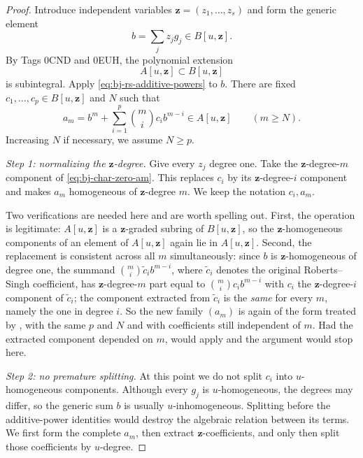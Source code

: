\begin{proof}
Introduce independent variables $\mathbf z=(z_1,\ldots,z_s)$ and form the
generic element
\[
                         b=\sum_j z_jg_j
                         \in B[u,\mathbf z].
\tag{44.5}\label{eq:bj-char-zero-generic-element}
\]
By Tags 0CND and 0EUH, the polynomial extension
\[
              A[u,\mathbf z]\subset B[u,\mathbf z]
\]
is subintegral.
Apply \eqref{eq:bj-rs-additive-powers} to $b$.
There are fixed $c_1,\ldots,c_p\in B[u,\mathbf z]$ and $N$ such that
\[
 a_m=b^m+\sum_{i=1}^p\binom mi c_i b^{m-i}
                    \in A[u,\mathbf z]
                    \qquad(m\ge N).
\tag{44.6}\label{eq:bj-char-zero-am}
\]
Increasing $N$ if necessary, we assume $N\ge p$.

\emph{Step 1: normalizing the $\mathbf z$-degree.}
Give every $z_j$ degree one.
Take the $\mathbf z$-degree-$m$ component of
\eqref{eq:bj-char-zero-am}.
This replaces $c_i$ by its $\mathbf z$-degree-$i$ component and makes
$a_m$ homogeneous of $\mathbf z$-degree $m$.
We keep the notation $c_i,a_m$.

Two verifications are needed here and are worth spelling out.  First, the
operation is legitimate: $A[u,\mathbf z]$ is a $\mathbf z$-graded
subring of $B[u,\mathbf z]$, so the $\mathbf z$-homogeneous components
of an element of $A[u,\mathbf z]$ again lie in $A[u,\mathbf z]$.
Second, the replacement is consistent across all $m$ simultaneously:
since $b$ is $\mathbf z$-homogeneous of degree one, the summand
$\binom mi\tilde c_ib^{m-i}$, where $\tilde c_i$ denotes the original
Roberts--Singh coefficient, has $\mathbf z$-degree-$m$ part equal to
$\binom mic_ib^{m-i}$ with $c_i$ the $\mathbf z$-degree-$i$
component of $\tilde c_i$; the component extracted from $\tilde c_i$ is
the \emph{same} for every $m$, namely the one in degree $i$.  So the new family $(a_m)$ is again of the form treated by
, with the same $p$ and $N$ and with
coefficients still independent of $m$.  Had the extracted component
depended on $m$,  would apply and the
argument would stop here.

\emph{Step 2: no premature splitting.}
At this point we do not split $c_i$ into $u$-homogeneous components.
Although every $g_j$ is $u$-homogeneous, the degrees may differ, so the
generic sum $b$ is usually $u$-inhomogeneous.
Splitting before the additive-power identities would destroy the algebraic
relation between its terms.
We first form the complete $a_m$, then extract $\mathbf z$-coefficients,
and only then split those coefficients by $u$-degree.


\end{proof}
